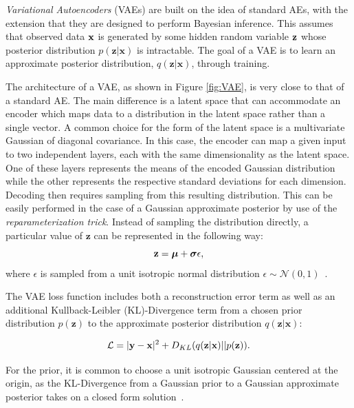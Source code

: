 \documentclass[11pt, a4paper]{article}
\begin{document}
\textit{Variational Autoencoders} (VAEs) are built on the idea of standard AEs, with the extension that they are designed to perform
Bayesian inference. 
This assumes that observed data $\textbf x$ is generated by some
hidden random variable $\textbf z$ whose posterior distribution $p(\textbf{z}|\textbf{x})$ 
is intractable. 
The goal of a VAE is to learn an approximate posterior distribution, $q(\textbf{z}|\textbf{x})$, through training.

The architecture of a VAE, as shown in Figure \ref{fig:VAE}, is very close to that of a standard AE. 
The main difference is a latent space that can accommodate an encoder which maps data to a distribution in the latent space rather than a single vector. 
A common choice for the form of the latent space is a multivariate Gaussian of diagonal covariance. 
In this case, the encoder can map a given input to two independent layers, 
each with the same dimensionality as the latent space.
One of these layers represents the means of the encoded Gaussian distribution while the other represents the respective standard deviations for each dimension.
Decoding then requires sampling from this resulting distribution. 
This can be easily performed in the case of a Gaussian approximate posterior by use of the \textit{reparameterization trick}.
Instead of sampling the distribution directly, a particular value of $\textbf{z}$ can be represented in the following way:
\begin{equation}
	{\textbf z} = \boldsymbol{\mu} + \boldsymbol{\sigma} \epsilon,
\end{equation}
where $\epsilon$ is sampled from a unit isotropic normal distribution $\epsilon \sim \mathcal{N}(0, 1)$~\cite{kingma2014autoencoding}.

The VAE loss function includes both a reconstruction error term as well as an additional Kullback-Leibler (KL)-Divergence term from a chosen prior distribution $p(\textbf{z})$ to the approximate posterior distribution $q(\textbf{z}|\textbf{x})$:

\begin{equation}
	\mathcal{L} = |{\textbf y} - {\textbf x}|^{2} + D_{KL}(q({\textbf z}|{\textbf x})||p({\textbf z})).
\end{equation} 


For the prior, it is common to choose a unit isotropic Gaussian centered at the origin, as the KL-Divergence from a Gaussian prior to a Gaussian approximate posterior takes on a closed form solution~\cite{Goodfellow-et-al-2016}.
\end{document}
